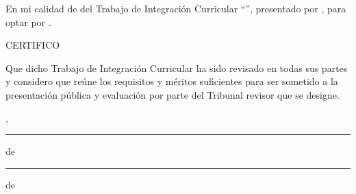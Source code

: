 
En mi calidad de \UTITutorEtiqueta{} del Trabajo de Integración Curricular ``\UTITituloProyectoMayusculas'', presentado por \UTIAutoresTexto, para optar por \UTIFraseTituloProfesional{}.

\begin{center}
CERTIFICO
\end{center}

Que dicho Trabajo de Integración Curricular ha sido revisado en todas sus partes y considero que reúne los requisitos y méritos suficientes para ser sometido a la presentación pública y evaluación por parte del Tribunal revisor que se designe.

\vspace{1.5cm}

{\raggedleft
\UTICiudadPais, \rule{1.2cm}{0.4pt} de \rule{1.2cm}{0.4pt} de \UTIAnio\par}

\vspace{2.5cm}

\UTIFirmaTutorBloque
